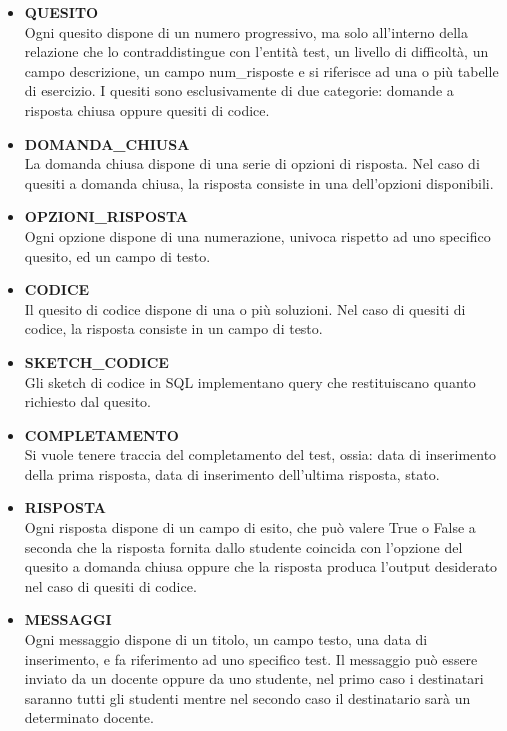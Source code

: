 \documentclass{article}
\begin{document}
\begin{itemize}[label={-}]
    \item \textbf{QUESITO} \vspace*{3px}\\ Ogni quesito dispone di un numero progressivo, ma solo all'interno della relazione che lo contraddistingue con l'entità test, un livello di difficoltà, un campo descrizione, un campo num\_risposte e si riferisce ad una o più tabelle di esercizio. I quesiti sono esclusivamente di due categorie: domande a risposta chiusa oppure quesiti di codice.
    \item \textbf{DOMANDA\_CHIUSA} \vspace*{3px}\\ La domanda chiusa dispone di una serie di opzioni di risposta. Nel caso di quesiti a domanda chiusa, la risposta consiste in una dell'opzioni disponibili. 
    \item \textbf{OPZIONI\_RISPOSTA} \vspace*{3px}\\ Ogni opzione dispone di una numerazione, univoca rispetto ad uno specifico quesito, ed un campo di testo. 
    \item \textbf{CODICE} \vspace*{3px}\\ Il quesito di codice dispone di una o più soluzioni. Nel caso di quesiti di codice, la risposta consiste in un campo di testo.
    \item \textbf{SKETCH\_CODICE} \vspace*{3px}\\ Gli sketch di codice in SQL implementano query che restituiscano quanto richiesto dal quesito.
    \item \textbf{COMPLETAMENTO} \vspace*{3px}\\ Si vuole tenere traccia del completamento del test, ossia: data di inserimento della prima risposta, data di inserimento dell'ultima risposta, stato.
    \item \textbf{RISPOSTA} \vspace*{3px}\\ Ogni risposta dispone di un campo di esito, che può valere True o False a seconda che la risposta fornita dallo studente coincida con l'opzione del quesito a domanda chiusa oppure che la risposta produca l'output desiderato nel caso di quesiti di codice.
    \item \textbf{MESSAGGI} \vspace*{3px}\\ Ogni messaggio dispone di un titolo, un campo testo, una data di inserimento, e fa riferimento ad uno specifico test. Il messaggio può essere inviato da un docente oppure da uno studente, nel primo caso i destinatari saranno tutti gli studenti mentre nel secondo caso il destinatario sarà un determinato docente.
\end{itemize}
\end{document}

